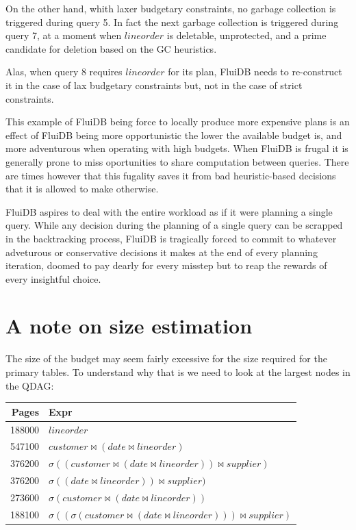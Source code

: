 On the other hand, whith laxer budgetary constraints, no garbage
collection is triggered during query 5. In fact the next garbage
collection is triggered during query 7, at a moment when
\(\mathit{lineorder}\) is deletable, unprotected, and a prime
candidate for deletion based on the GC heuristics.

Alas, when query 8 requires \(\mathit{lineorder}\) for its plan,
FluiDB needs to re-construct it in the case of lax budgetary
constraints but, not in the case of strict constraints.

This example of FluiDB being force to locally produce more expensive
plans is an effect of FluiDB being more opportunistic the lower the
available budget is, and more adventurous when operating with high
budgets. When FluiDB is frugal it is generally prone to miss
oportunities to share computation between queries. There are times
however that this fugality saves it from bad heuristic-based decisions
that it is allowed to make otherwise.

FluiDB aspires to deal with the entire workload as if it were planning
a single query. While any decision during the planning of a single
query can be scrapped in the backtracking process, FluiDB is
tragically forced to commit to whatever adveturous or conservative
decisions it makes at the end of every planning iteration, doomed to
pay dearly for every misstep but to reap the rewards of every
insightful choice.

\section{A note on size estimation}
\label{sec:size_estimation_problems}
The size of the budget may seem fairly excessive for the size required
for the primary tables. To understand why that is we need to look at
the largest nodes in the QDAG:

\begin{center}
\begin{tabular}{rl}
Pages & Expr\\
\hline
188000 & \(lineorder\)\\
547100 & \(customer \Join (date \Join lineorder)\)\\
376200 & \(\sigma ((customer \Join (date \Join lineorder)) \Join supplier)\)\\
376200 & \(\sigma ((date \Join lineorder)) \Join supplier)\)\\
273600 & \(\sigma (customer \Join (date \Join lineorder))\)\\
188100 & \(\sigma ((\sigma (customer \Join (date \Join lineorder))) \Join supplier)\)\\
\end{tabular}
\end{center}

